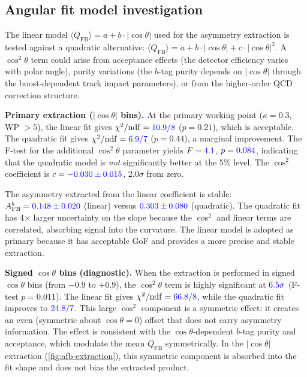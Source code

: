 \documentclass[11pt,a4paper]{article}
\newcommand{\measured}[1]{\textcolor{blue}{#1}}
\begin{document}
\subsection{Angular fit model investigation}
\label{sec:angular-fit}

The linear model $\langle Q_\mathrm{FB} \rangle = a + b \cdot
|\cos\theta|$ used for the asymmetry extraction is tested against a
quadratic alternative: $\langle Q_\mathrm{FB} \rangle = a + b \cdot
|\cos\theta| + c \cdot |\cos\theta|^2$.  A $\cos^2\theta$ term could
arise from acceptance effects (the detector efficiency varies with polar
angle), purity variations (the $b$-tag purity depends on $|\cos\theta|$
through the boost-dependent track impact parameters), or from the
higher-order QCD correction structure.

\textbf{Primary extraction ($|\cos\theta|$ bins).}
At the primary working point ($\kappa = 0.3$, WP $> 5$), the linear fit
gives $\chi^2/\mathrm{ndf} = \measured{10.9/8}$ ($p = 0.21$), which is
acceptable.  The quadratic fit gives $\chi^2/\mathrm{ndf} = \measured{6.9/7}$
($p = 0.44$), a marginal improvement.  The F-test for the additional
$\cos^2\theta$ parameter yields $F = \measured{4.1}$, $p = \measured{0.084}$,
indicating that the quadratic model is \emph{not} significantly better at the
5\% level.  The $\cos^2$ coefficient is
$c = \measured{-0.030 \pm 0.015}$, 2.0$\sigma$ from zero.

The asymmetry extracted from the linear coefficient is stable:
$A_\mathrm{FB}^b = \measured{0.148 \pm 0.020}$ (linear) versus
$\measured{0.303 \pm 0.080}$ (quadratic).  The quadratic fit has
4$\times$ larger uncertainty on the slope because the $\cos^2$ and linear
terms are correlated, absorbing signal into the curvature.  The linear
model is adopted as primary because it has acceptable GoF and provides
a more precise and stable extraction.

\textbf{Signed $\cos\theta$ bins (diagnostic).}
When the extraction is performed in signed $\cos\theta$ bins (from $-0.9$
to $+0.9$), the $\cos^2\theta$ term is highly significant at
$\measured{6.5\sigma}$ (F-test $p = 0.011$).  The linear fit gives
$\chi^2/\mathrm{ndf} = \measured{66.8/8}$, while the quadratic fit
improves to $\measured{24.8/7}$.  This large $\cos^2$ component is a
symmetric effect: it creates an even (symmetric about $\cos\theta = 0$)
offset that does not carry asymmetry information.  The effect is
consistent with the $\cos\theta$-dependent $b$-tag purity and acceptance,
which modulate the mean $Q_\mathrm{FB}$ symmetrically.  In the
$|\cos\theta|$ extraction (\cref{fig:afb-extraction}), this symmetric
component is absorbed into the fit shape and does not bias the extracted
product.
\end{document}
